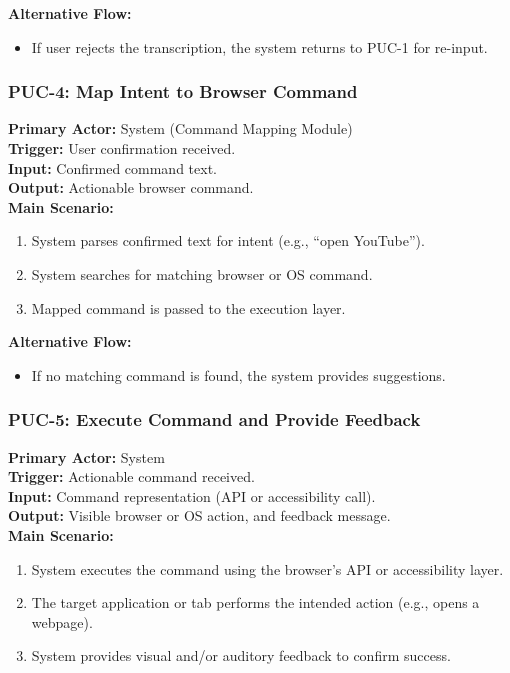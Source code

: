 \documentclass[11pt]{article}
\begin{document}
\textbf{Alternative Flow:}
\begin{itemize}
  \item If user rejects the transcription, the system returns to PUC-1 for re-input.
\end{itemize}

\bigskip

\subsubsection*{PUC-4: Map Intent to Browser Command}
\textbf{Primary Actor:} System (Command Mapping Module) \\
\textbf{Trigger:} User confirmation received. \\
\textbf{Input:} Confirmed command text. \\
\textbf{Output:} Actionable browser command. \\

\textbf{Main Scenario:}
\begin{enumerate}
  \item System parses confirmed text for intent (e.g., “open YouTube”).
  \item System searches for matching browser or OS command.
  \item Mapped command is passed to the execution layer.
\end{enumerate}

\textbf{Alternative Flow:}
\begin{itemize}
  \item If no matching command is found, the system provides suggestions.
\end{itemize}

\bigskip

\subsubsection*{PUC-5: Execute Command and Provide Feedback}
\textbf{Primary Actor:} System \\
\textbf{Trigger:} Actionable command received. \\
\textbf{Input:} Command representation (API or accessibility call). \\
\textbf{Output:} Visible browser or OS action, and feedback message. \\

\textbf{Main Scenario:}
\begin{enumerate}
  \item System executes the command using the browser’s API or accessibility layer.
  \item The target application or tab performs the intended action (e.g., opens a webpage).
  \item System provides visual and/or auditory feedback to confirm success.
\end{enumerate}
\end{document}

